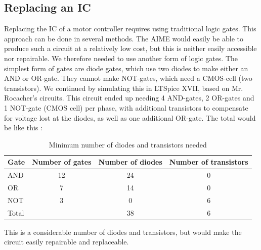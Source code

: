 \subsection{Replacing an IC}

Replacing the IC of a motor controller requires using traditional logic gates. This approach can be done in several methods. The AIME would easily be able to produce such a circuit at a relatively low cost, but this is neither easily accessible nor repairable. We therefore needed to use another form of logic gates. The simplest form of gates are diode gates, which use two diodes to make either an AND or OR-gate. They cannot make NOT-gates, which need a CMOS-cell (two transistors). We continued by simulating this in LTSpice XVII, based on Mr. Rocacher's circuits. This circuit ended up needing 4 AND-gates, 2 OR-gates and 1 NOT-gate (CMOS cell) per phase, with additional transistors to compensate for voltage lost at the diodes, as well as one additional OR-gate. The total would be like this :

\begin{table}[htbp]
	\caption{Minimum number of diodes and transistors needed}
	\label{tab:decompte}
	\centering
	\begin{tabular}{lccc}
		\toprule
		\textbf{Gate} & Number of gates & \textbf{Number of diodes} & \textbf{Number of transistors} \\
		\midrule
		AND & 12  & 24 & 0 \\
		OR & 7 & 14 & 0 \\
		NOT & 3 & 0 & 6\\
		\bottomrule
		Total & & 38 & 6
	\end{tabular}
\end{table}

This is a considerable number of diodes and transistors, but would make the circuit easily repairable and replaceable.
